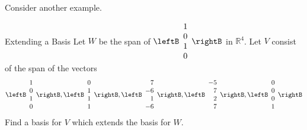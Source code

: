 Consider another example.

\begin{example}{Extending a Basis}
Let $W$ be the span of $\leftB
\begin{array}{c}
1 \\ 
0 \\ 
1 \\ 
0
\end{array}
\rightB $ in $\mathbb{R}^{4}$. Let $V$ consist of the span of the vectors 
\begin{equation*}
\leftB
\begin{array}{c}
1 \\ 
0 \\ 
1 \\ 
0
\end{array}
\rightB ,\leftB 
\begin{array}{c}
0 \\ 
1 \\ 
1 \\ 
1
\end{array}
\rightB ,\leftB 
\begin{array}{r}
7 \\ 
-6 \\ 
1 \\ 
-6
\end{array}
\rightB ,\leftB 
\begin{array}{r}
-5 \\ 
7 \\ 
2 \\ 
7
\end{array}
\rightB ,\leftB 
\begin{array}{c}
0 \\ 
0 \\ 
0 \\ 
1
\end{array}
\rightB
\end{equation*}
Find a basis for $V$ which extends the basis for $W$.
\end{example}

